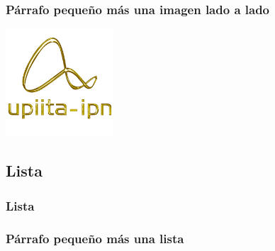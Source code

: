 	\begin{frame}
		\frametitle{Párrafo pequeño más una imagen lado a lado}
		
		\begin{minipage}{\textwidth}
			\begin{minipage}{0.60\textwidth}
				\lipsum[5][1-8]
			\end{minipage}
			\hfill
			\begin{minipage}{0.35\textwidth}
				\includegraphics[height=40mm]{images/logo_upiita_oro}
			\end{minipage}
		\end{minipage}
	\end{frame}
	\begin{frame}
		\section{Lista}
		\frametitle{Lista}
		\frametitle{Párrafo pequeño más una lista}
		\lipsum[3][1-5]
		
		\SetLipsumSentenceListSurrounders{\begin{itemize}}{\end{itemize}}
		\SetLipsumSentenceListItemStart{\item}
		\lipsum[3][6-9]
	\end{frame}

